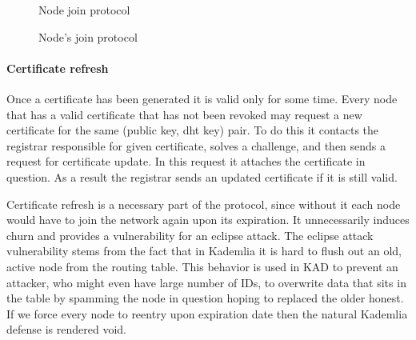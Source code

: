 \begin{figure}
\begin{msc}{Node join protocol}
\setlength{\instdist}{5.5cm}
\setlength{\envinstdist}{3cm}
\setlength{\instwidth}{2.5cm}
\nextlevel
{}
\nextlevel[5]
\nextlevel
{}
\nextlevel[1]


\nextlevel[6]


\nextlevel


\nextlevel[2]
\nextlevel[1]
\end{msc}
\caption{Node's join protocol}
\label{fig:node_join_prot}
\end{figure}

\paragraph{Certificate refresh} Once a certificate has been generated it is
valid only for some time. Every node that has a valid certificate that has not
been revoked may request a new certificate for the same (public key, dht key)
pair. To do this it contacts the registrar responsible for given certificate,
solves a challenge, and then sends a request for certificate update. In this
request it attaches the certificate in question. As a result the registrar sends
an updated certificate if it is still valid.

Certificate refresh is a necessary part of the protocol, since without it each
node would have to join the network again upon its expiration. It unnecessarily
induces churn and provides a vulnerability for an eclipse attack. The eclipse
attack vulnerability stems from the fact that in Kademlia it is hard to flush
out an old, active node from the routing table. This behavior is used in KAD to
prevent an attacker, who might even have large number of IDs, to overwrite data
that sits in the table by spamming the node in question hoping to replaced the
older honest. If we force every node to reentry upon expiration date then the
natural Kademlia defense is rendered void.

